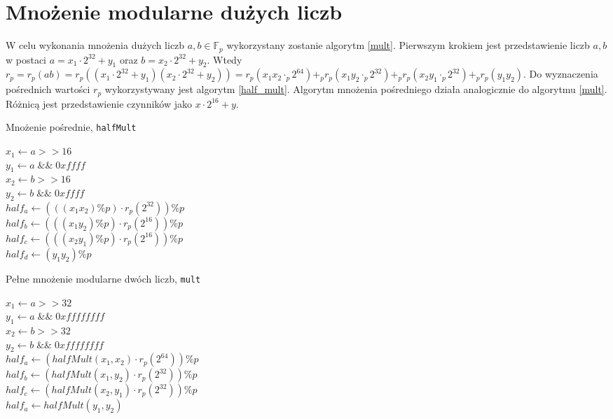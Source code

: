 \documentclass[]{article}
\begin{document}
\section{Mnożenie modularne dużych liczb}
	W celu wykonania mnożenia dużych liczb \(a, b \in \mathbb{F}_p\) wykorzystany zostanie algorytm \ref{mult}.
	Pierwszym krokiem jest przedstawienie liczb \(a, b\) w postaci \(a = x_1 \cdot 2^{32} + y_1\) oraz 
	\(b = x_2 \cdot 2^{32} + y_2\).
	\newline
	Wtedy
	\newline
	\(r_p = r_p(ab) = r_p((x_1 \cdot 2^{32} + y_1)(x_2 \cdot 2^{32} + y_2)) = r_p(x_1x_2 \cdot_p 2^{64}) +_p r_p(x_1y_2 \cdot_p 2^{32}) +_p r_p(x_2y_1 \cdot_p 2^{32}) +_p r_p(y_1y_2)\).
	\newline 
	Do wyznaczenia pośrednich wartości \(r_p\) wykorzystywany jest algorytm \ref{half_mult}. Algorytm mnożenia pośredniego działa analogicznie do algorytmu \ref{mult}. Różnicą jest przedstawienie czynników jako \(x \cdot 2^{16} + y\).
	\newline
	\begin{algorithm}[H]
		\SetAlgoLined
		\caption{Mnożenie pośrednie, \texttt{halfMult}}
		\label{half_mult}
		\(x_1 \gets a >> 16\)\\
		\(y_1 \gets a \; \&\& \; 0xffff \) \\
		\(x_2 \gets b >> 16\)\\
		\(y_2 \gets b \; \&\& \; 0xffff \) \\
		\(half_a \gets (((x_1 x_2) \% p) \cdot r_p(2^{32})) \%p\) \\
		\(half_b \gets (((x_1 y_2) \% p) \cdot r_p(2^{16})) \%p\) \\
		\(half_c \gets (((x_2 y_1) \% p) \cdot r_p(2^{16})) \%p\) \\
		\(half_d \gets (y_1 y_2) \%p\) \\
	\end{algorithm}

	
	\begin{algorithm}[H]
		\SetAlgoLined
		\caption{Pełne mnożenie modularne dwóch liczb, \texttt{mult}}
		\label{mult}
		\(x_1 \gets a >> 32\)\\
		\(y_1 \gets a \; \&\& \; 0xffffffff \) \\
		\(x_2 \gets b >> 32\)\\
		\(y_2 \gets b \; \&\& \; 0xffffffff \) \\
		\(half_a \gets (halfMult(x_1, x_2) \cdot r_p(2^{64})) \% p\) \\
		\(half_b \gets (halfMult(x_1, y_2) \cdot r_p(2^{32})) \% p\) \\
		\(half_c \gets (halfMult(x_2, y_1) \cdot r_p(2^{32})) \% p\) \\
		\(half_a \gets halfMult(y_1, y_2)\) \\
	\end{algorithm}
	
\end{document}
